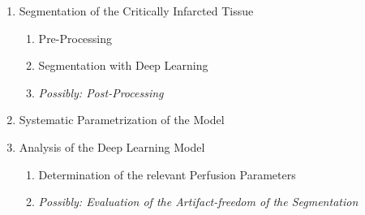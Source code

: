 \documentclass{article}%
\begin{document}
\begin{enumerate}
\item Segmentation of the Critically Infarcted Tissue
\begin{enumerate}
\item Pre-Processing
\item Segmentation with Deep Learning
\item \textit{Possibly: Post-Processing}
\end{enumerate}
\item Systematic Parametrization of the Model
\item Analysis of the Deep Learning Model
\begin{enumerate}
\item Determination of the relevant Perfusion Parameters
\item \textit{Possibly: Evaluation of the Artifact-freedom of the Segmentation}
\end{enumerate}
\end{enumerate}

% 
% 
\end{document}
